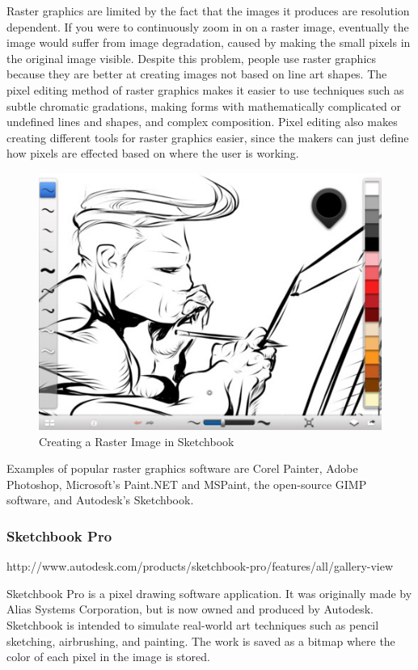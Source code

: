 \documentclass[12pt]{report}
\begin{document}
Raster graphics are limited by the fact that the images it produces are resolution dependent. 
If you were to continuously zoom in on a raster image, eventually the image would suffer from image degradation, caused by making the small pixels in the original image visible.
Despite this problem, people use raster graphics because they are better at creating images not based on line art shapes. 
The pixel editing method of raster graphics makes it easier to use techniques such as subtle chromatic gradations, making forms with mathematically complicated or undefined lines and shapes, and complex composition. 
Pixel editing also makes creating different tools for raster graphics easier, since the makers can just define how pixels are effected based on where the user is working. 
\begin{figure}
\includegraphics[width=\textwidth]{sketchbook.jpg}
\caption{Creating a Raster Image in Sketchbook}
\end{figure}



Examples of popular raster graphics software are Corel Painter, Adobe Photoshop, Microsoft's Paint.NET and MSPaint, the open-source GIMP software, and Autodesk's Sketchbook.

\subsubsection{Sketchbook Pro} http://www.autodesk.com/products/sketchbook-pro/features/all/gallery-view

Sketchbook Pro is a pixel drawing software application. It was originally made by Alias Systems Corporation, but is now owned and produced by Autodesk. Sketchbook is intended to simulate real-world art techniques such as pencil sketching, airbrushing, and painting. The work is saved as a bitmap where the color of each pixel in the image is stored. 
\end{document}
